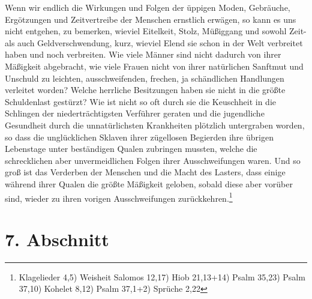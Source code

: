 \medskip

Wenn wir endlich die Wirkungen und Folgen der üppigen Moden, Gebräuche,
Ergötzungen und Zeitvertreibe der Menschen ernstlich erwägen, so kann es uns
nicht entgehen, zu bemerken, wieviel Eitelkeit, Stolz, Müßiggang und sowohl
Zeit- als auch Geldverschwendung, kurz, wieviel Elend sie schon in der Welt
verbreitet haben und noch verbreiten. Wie viele Männer sind nicht dadurch von
ihrer Mäßigkeit abgebracht, wie viele Frauen nicht von ihrer natürlichen
Sanftmut und Unschuld zu leichten, ausschweifenden, frechen, ja schändlichen
Handlungen verleitet worden? Welche herrliche Besitzungen haben sie nicht in die
größte Schuldenlast gestürzt? Wie ist nicht so oft durch sie die Keuschheit in
die Schlingen der niederträchtigsten Verführer geraten und die jugendliche
Gesundheit durch die unnatürlichsten Krankheiten plötzlich untergraben worden,
so dass die unglücklichen Sklaven ihrer zügellosen
Begierden ihre
übrigen
Lebenstage unter beständigen Qualen zubringen mussten, welche die schrecklichen
aber unvermeidlichen Folgen ihrer Ausschweifungen waren. Und so groß ist das
Verderben der Menschen und die Macht des Lasters, dass einige während ihrer
Qualen die größte Mäßigkeit geloben, sobald diese aber vorüber sind, wieder zu
ihren vorigen Ausschweifungen zurückkehren.\footnote{
Klagelieder 4,5)
Weisheit Salomos 12,17)
Hiob 21,13+14)
Psalm 35,23)
Psalm 37,10)
Kohelet 8,12)
Psalm 37,1+2)
Sprüche 2,22}

\section{7. Abschnitt} \label{kap18_ab7}

